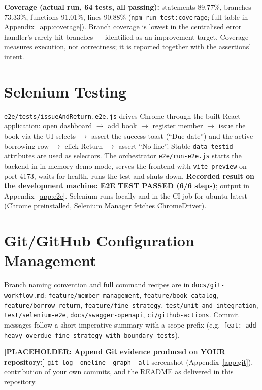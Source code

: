 \documentclass[12pt,a4paper]{article}
\newcommand{\placeholder}[1]{\textbf{[PLACEHOLDER: #1]}}
\begin{document}
\textbf{Coverage (actual run, 64 tests, all passing):}
statements 89.77\%, branches 73.33\%, functions 91.01\%, lines 90.88\%
(\texttt{npm run test:coverage}; full table in Appendix~\ref{app:coverage}).
Branch coverage is lowest in the centralised error handler's rarely-hit
branches — identified as an improvement target. Coverage measures execution,
not correctness; it is reported together with the assertions' intent.

\section{Selenium Testing}
\texttt{e2e/tests/issueAndReturn.e2e.js} drives Chrome through the built
React application: open dashboard $\rightarrow$ add book $\rightarrow$
register member $\rightarrow$ issue the book via the UI selects
$\rightarrow$ assert the success toast (``Due date'') and the active
borrowing row $\rightarrow$ click Return $\rightarrow$ assert ``No fine''.
Stable \texttt{data-testid} attributes are used as selectors. The
orchestrator \texttt{e2e/run-e2e.js} starts the backend in in-memory demo
mode, serves the frontend with \texttt{vite preview} on port 4173, waits for
health, runs the test and shuts down. \textbf{Recorded result on the
development machine: E2E TEST PASSED (6/6 steps)}; output in
Appendix~\ref{app:e2e}. Selenium runs locally and in the CI job for
ubuntu-latest (Chrome preinstalled, Selenium Manager fetches ChromeDriver).

\section{Git/GitHub Configuration Management}
Branch naming convention and full command recipes are in
\texttt{docs/git-workflow.md}: \texttt{feature/member-management},
\texttt{feature/book-catalog}, \texttt{feature/borrow-return},
\texttt{feature/fine-strategy}, \texttt{test/unit-and-integration},
\texttt{test/selenium-e2e}, \texttt{docs/swagger-openapi},
\texttt{ci/github-actions}. Commit messages follow a short imperative
summary with a scope prefix (e.g.\ \texttt{feat: add heavy-overdue fine
strategy with boundary tests}).

\placeholder{Append Git evidence produced on YOUR repository:}
\texttt{git log --oneline --graph --all} screenshot (Appendix~\ref{app:git}),
contribution of your own commits, and the README as delivered in this
repository.
\end{document}
